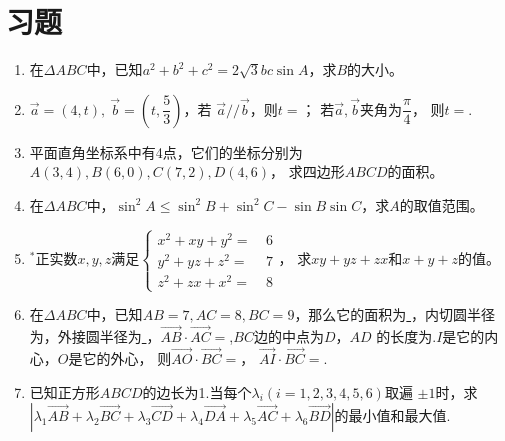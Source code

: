 \section{习题}
\begin{enumerate}[label={\textbf{\arabic*.}},leftmargin=
    \inteval{\myenumleftmargin}pt]
\item 在$ \Delta ABC $中，已知$ a^2+b^2+c^2=2\sqrt{3}bc\sin A $，求$ B $的大小。

\item $ \vec{a}=(4,t),\ \vec{b}=\left(t,\dfrac{5}{3}\right) $，若
$ \vec{a}//\vec{b} $，则$ t= $\underline{\hspace{2cm}}；
若$ \vec{a},\vec{b} $夹角为$ \dfrac{\pi}{4} $，
则$ t= $\underline{\hspace{2cm}}.

\item 平面直角坐标系中有4点，它们的坐标分别为$ A(3,4),B(6,0),C(7,2),D(4,6) $，
求四边形$ ABCD $的面积。

\item 在$ \Delta ABC $中，$ \sin^2A\leq\sin^2B+\sin^2C-
\sin B\sin C $，求$ A $的取值范围。

\item $ ^* $正实数$ x,y,z $满足$ \left\{ \begin{aligned} x^2+xy+y^2 =&\ 6 \\
    y^2+yz+z^2=&\ 7  \\
    z^2+zx+x^2=&\ 8  \end{aligned} \right. $，
求$ xy+yz+zx $和$ x+y+z $的值。

\item 在$ \Delta ABC $中，已知$ AB=7,AC=8,BC=9 $，那么它的面积为\underline{
    \hspace{1cm}}，内切圆半径为\underline{\hspace{1cm}}，外接圆半径为\underline{
    \hspace{1cm}}，$ \vec{AB}\cdot \vec{AC}
=$\underline{\hspace{1cm}},$ BC $边的中点为$ D $，$ AD $
的长度为\underline{\hspace{1cm}}.$ I $是它的内心，$ O $是它的外心，
则$ \vec{AO}\cdot\vec{BC} = $\underline{\hspace{2cm}}，
$ \vec{AI}\cdot\vec{BC}= $\underline{\hspace{2cm}}.

\item 已知正方形$ ABCD $的边长为1.当每个$ \lambda_i(i=1,2,3,4,5,6) $取遍
$ \pm 1 $时，求\\ $|\lambda_1\vec{AB}+\lambda_2\vec{BC}+\lambda_3
\vec{CD}+\lambda_4\vec{DA}+\lambda_5 \vec{AC}+\lambda_6\vec{BD}| 
$的最小值和最大值.


\end{enumerate}
